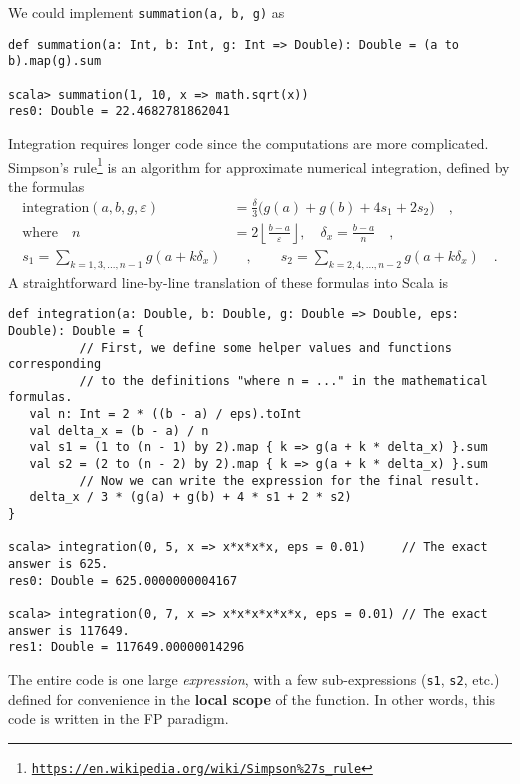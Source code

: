 We could implement \texttt{}\lstinline!summation(a, b, g)! as
\begin{lstlisting}
def summation(a: Int, b: Int, g: Int => Double): Double = (a to b).map(g).sum

scala> summation(1, 10, x => math.sqrt(x))
res0: Double = 22.4682781862041
\end{lstlisting}

Integration requires longer code since the computations are more complicated.
Simpson\textsf{'}s rule\footnote{\texttt{\href{https://en.wikipedia.org/wiki/Simpson\%27s_rule}{https://en.wikipedia.org/wiki/Simpson\%27s\_rule}}}
is an algorithm for approximate numerical integration, defined by
the formulas
\begin{align*}
\text{integration}\left(a,b,g,\varepsilon\right) & =\frac{\delta}{3}\big(g(a)+g(b)+4s_{1}+2s_{2}\big)\quad,\\
\text{where }~~~n & =2\left\lfloor \frac{b-a}{\varepsilon}\right\rfloor ,\quad\delta_{x}=\frac{b-a}{n}\quad,\\
s_{1}=\sum_{k=1,3,...,n-1}g(a+k\delta_{x}) & \quad,\quad\quad s_{2}=\sum_{k=2,4,...,n-2}g(a+k\delta_{x})\quad.
\end{align*}
 A straightforward line-by-line translation of these formulas into
Scala is
\begin{lstlisting}
def integration(a: Double, b: Double, g: Double => Double, eps: Double): Double = {
          // First, we define some helper values and functions corresponding
          // to the definitions "where n = ..." in the mathematical formulas.
   val n: Int = 2 * ((b - a) / eps).toInt
   val delta_x = (b - a) / n
   val s1 = (1 to (n - 1) by 2).map { k => g(a + k * delta_x) }.sum
   val s2 = (2 to (n - 2) by 2).map { k => g(a + k * delta_x) }.sum
          // Now we can write the expression for the final result.
   delta_x / 3 * (g(a) + g(b) + 4 * s1 + 2 * s2)
}

scala> integration(0, 5, x => x*x*x*x, eps = 0.01)     // The exact answer is 625.
res0: Double = 625.0000000004167

scala> integration(0, 7, x => x*x*x*x*x*x, eps = 0.01) // The exact answer is 117649.
res1: Double = 117649.00000014296
\end{lstlisting}

The entire code is one large \emph{expression}, with a few sub-expressions
(\lstinline!s1!, \lstinline!s2!, etc.) defined for convenience in
the \textbf{local scope} of the function. In other
words, this code is written in the FP paradigm.

